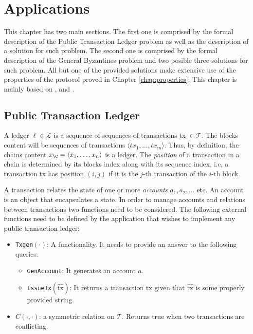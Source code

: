 \documentclass[..]{subfiles}
\begin{document}
\chapter{Applications}\label{chap:applications}

This chapter has two main sections. The first one is comprised by the formal description of the Public Transaction Ledger problem as well as the description of a solution for such problem. The second one is comprised by the formal description of the General Byzantines problem and two posible three solutions for such problem. All but one of the provided solutions make extensive use of the properties of the protocol proved in Chapter \ref{chap:properties}. This chapter is mainly based on \cite{garay2015bitcoin}, \cite{santoro2006design} and \cite{zhang2013om}.


\section{Public Transaction Ledger}

A ledger $\ell \in \mathcal{L}$ is a sequence of sequences of transactions tx $\in \mathcal{T}$. The blocks content will be sequences of transactions $\langle tx_1, \dots, tx_m \rangle$. Thus, by definition, the chains content $x_\C = \langle x_1, \dots, x_n \rangle$ is a ledger. The \textit{position} of a transaction in a chain is determined by its blocks index along with its sequence index, i.e, a transaction tx has position $(i, j)$ if it is the $j$-th transaction of the $i$-th block.

A transaction relates the state of one or more \textit{accounts} $a_1, a_2, \dots$ etc. An account is an object that encapsulates a state. In order to manage accounts and relations between transactions two functions need to be considered. The following external functions need to be defined by the application that wishes to implement any public transaction ledger:
\begin{itemize}
	\item \texttt{Txgen}$(\cdot)$: A functionality. It needs to provide an answer to the following queries:
	\begin{itemize}
		\item \texttt{GenAccount}: It generates an account $a$.
		\item \texttt{IssueTx}$(\hat{\textrm{tx}})$: It returns a transaction tx given that $\hat{\textrm{tx}}$ is some properly provided string.
	\end{itemize}

	\item $C(\cdot, \cdot)$: a symmetric relation on $\mathcal T$. Returns true when two transactions are conflicting.
\end{itemize}
\end{document}
